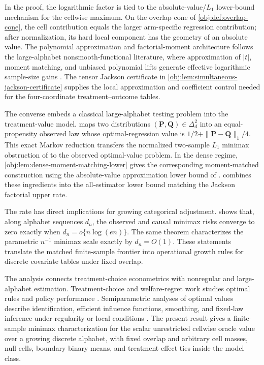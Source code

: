 \documentclass[11pt]{article}
\begin{document}
In the proof, the logarithmic factor is tied to the absolute-value/\(L_1\) lower-bound mechanism for the cellwise maximum. On the overlap cone of \cref{obj:def:overlap-cone}, the cell contribution equals the larger arm-specific regression contribution; after normalization, its hard local component has the geometry of an absolute value. The polynomial approximation and factorial-moment architecture follows the large-alphabet nonsmooth-functional literature, where approximation of \(|t|\), moment matching, and unbiased polynomial lifts generate effective logarithmic sample-size gains \citep{CaiLow2011L1,JiaoVenkatHanWeissman2015Functionals,Wu2016,HanJiaoWeissman2018Local,Valiant2017}. The tensor Jackson certificate in \cref{obj:lem:simultaneous-jackson-certificate} supplies the local approximation and coefficient control needed for the four-coordinate treatment--outcome tables.

The converse embeds a classical large-alphabet testing problem into the treatment-value model.  maps two distributions \((\mathbf P,\mathbf Q)\in\Delta_d^2\) into an equal-propensity observed law whose optimal-regression value is \(1/2+\|\mathbf P-\mathbf Q\|_1/4\). This exact Markov reduction transfers the normalized two-sample \(L_1\) minimax obstruction of \citet{JiaoHanWeissman2018L1} to the observed optimal-value problem. In the dense regime, \cref{obj:lem:dense-moment-matching-lower} gives the corresponding moment-matched construction using the absolute-value approximation lower bound of \citet{CaiLow2011L1}.  combines these ingredients into the all-estimator lower bound matching the Jackson factorial upper rate.

The rate has direct implications for growing categorical adjustment.  shows that, along alphabet sequences \(d_n\), the observed and causal minimax risks converge to zero exactly when \(d_n=o\{n\log(en)\}\). The same theorem characterizes the parametric \(n^{-1}\) minimax scale exactly by \(d_n=O(1)\). These statements translate the matched finite-sample frontier into operational growth rules for discrete covariate tables under fixed overlap.

The analysis connects treatment-choice econometrics with nonregular and large-alphabet estimation. Treatment-choice and welfare-regret work studies optimal rules and policy performance \citep{Manski2004,Murphy2003,Hirano2009,Kitagawa2018,Qian2011,Athey2021}. Semiparametric analyses of optimal values describe identification, efficient influence functions, smoothing, and fixed-law inference under regularity or local conditions \citep{Robins1986,Rosenbaum1983,vanDerLaan2015,LuedtkeVanderLaan2016OptimalValue,Chakraborty2010,Hirano2012,Chen2023,WhitehouseChenAusternSyrgkanis2025,Wei2025}. The present result gives a finite-sample minimax characterization for the scalar unrestricted cellwise oracle value over a growing discrete alphabet, with fixed overlap and arbitrary cell masses, null cells, boundary binary means, and treatment-effect ties inside the model class.
\end{document}

